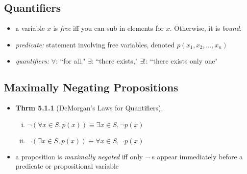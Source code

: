 \documentclass[11pt]{article}
\theoremstyle{definition}
\begin{document}
\subsection*{Quantifiers}
\begin{itemize}
    \item a variable $x$ is \emph{free} iff you can sub in elements for $x$. Otherwise, it is \emph{bound}.
    \item \emph{predicate:} statement involving free variables, denoted $p(x_1,x_2,\dots,x_n)$
    \item \emph{quantifiers:} $\forall$: ``for all," $\exists$: ``there exists," $\exists!$: ``there exists only one"
\end{itemize}
\subsection*{Maximally Negating Propositions}
\begin{itemize}
    \item \textbf{Thrm 5.1.1} (DeMorgan's Laws for Quantifiers).
    \begin{enumerate}[(i)]
        \item $\neg (\forall x\in S, p(x)) \equiv \exists x\in S, \neg p(x)$
        \item $\neg (\exists x\in S, p(x)) \equiv \forall x\in S, \neg p(x)$
    \end{enumerate}
    \item a proposition is \emph{maximally negated} iff only $\neg$ s appear immediately before a predicate or propositional variable
\end{itemize}
\end{document}
